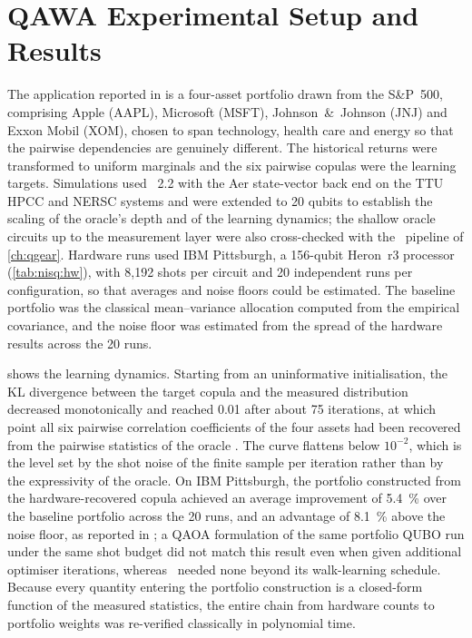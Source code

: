 \section{QAWA Experimental Setup and Results}\label{sec:nisq:qawa-results}

The application reported in \cite{guo2025qawa} is a four-asset portfolio drawn from the S\&P~500, comprising Apple (AAPL), Microsoft (MSFT), Johnson~\&~Johnson (JNJ) and Exxon Mobil (XOM), chosen to span technology, health care and energy so that the pairwise dependencies are genuinely different. The historical returns were transformed to uniform marginals and the six pairwise copulas were the learning targets. Simulations used \qiskit\ 2.2 with the Aer state-vector back end on the TTU HPCC and NERSC systems and were extended to 20 qubits to establish the scaling of the oracle's depth and of the learning dynamics; the shallow oracle circuits up to the measurement layer were also cross-checked with the \qgear\ pipeline of \cref{ch:qgear}. Hardware runs used IBM Pittsburgh, a 156-qubit Heron~r3 processor (\cref{tab:nisq:hw}), with 8,192 shots per circuit and 20 independent runs per configuration, so that averages and noise floors could be estimated. The baseline portfolio was the classical mean--variance allocation computed from the empirical covariance, and the noise floor was estimated from the spread of the hardware results across the 20 runs.

 shows the learning dynamics. Starting from an uninformative initialisation, the KL divergence between the target copula and the measured distribution decreased monotonically and reached 0.01 after about 75 iterations, at which point all six pairwise correlation coefficients of the four assets had been recovered from the pairwise statistics of the oracle \cite{guo2025qawa}. The curve flattens below $10^{-2}$, which is the level set by the shot noise of the finite sample per iteration rather than by the expressivity of the oracle. On IBM Pittsburgh, the portfolio constructed from the hardware-recovered copula achieved an average improvement of \SI{5.4}{\percent} over the baseline portfolio across the 20 runs, and an advantage of \SI{8.1}{\percent} above the noise floor, as reported in \cite{guo2025qawa}; a QAOA formulation of the same portfolio QUBO run under the same shot budget did not match this result even when given additional optimiser iterations, whereas \qawa\ needed none beyond its walk-learning schedule. Because every quantity entering the portfolio construction is a closed-form function of the measured statistics, the entire chain from hardware counts to portfolio weights was re-verified classically in polynomial time.

